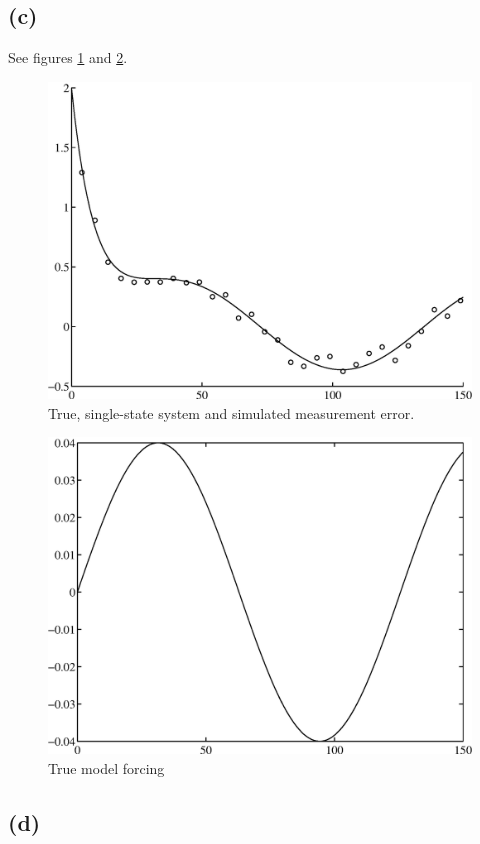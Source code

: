 \documentclass[fleqn, letterpaper]{tufte-handout}
\begin{document}
\subsection{(c)}
See figures \ref{2ca} and \ref{2cb}.
\begin{figure}
        \includegraphics[width=\textwidth]{2ca}
        \caption{True, single-state system and simulated measurement error.}
        \label{2ca}
\end{figure}
\begin{figure}
        \includegraphics[width=\textwidth]{2cb}
        \caption{True model forcing}
        \label{2cb}
\end{figure}

\subsection{(d)}
\end{document}
